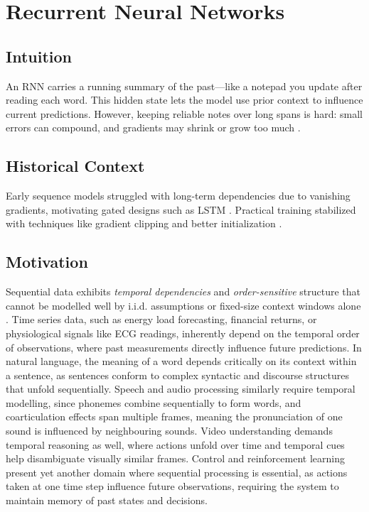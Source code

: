 
\section{Recurrent Neural Networks }
\label{sec:rnns}

\subsection*{Intuition}

An RNN carries a running summary of the past—like a notepad you update after reading each word. This hidden state lets the model use prior context to influence current predictions. However, keeping reliable notes over long spans is hard: small errors can compound, and gradients may shrink or grow too much \cite{GoodfellowEtAl2016}.

\subsection*{Historical Context}

Early sequence models struggled with long-term dependencies due to vanishing gradients, motivating gated designs such as LSTM \cite{Hochreiter1997}. Practical training stabilized with techniques like gradient clipping and better initialization \cite{GoodfellowEtAl2016}.


\subsection{Motivation}

Sequential data exhibits \emph{temporal dependencies} and \emph{order-sensitive} structure that cannot be modelled well by i.i.d. assumptions or fixed-size context windows alone \cite{GoodfellowEtAl2016,Prince2023,Bishop2006}. Time series data, such as energy load forecasting, financial returns, or physiological signals like ECG readings, inherently depend on the temporal order of observations, where past measurements directly influence future predictions. In natural language, the meaning of a word depends critically on its context within a sentence, as sentences conform to complex syntactic and discourse structures that unfold sequentially. Speech and audio processing similarly require temporal modelling, since phonemes combine sequentially to form words, and coarticulation effects span multiple frames, meaning the pronunciation of one sound is influenced by neighbouring sounds. Video understanding demands temporal reasoning as well, where actions unfold over time and temporal cues help disambiguate visually similar frames. Control and reinforcement learning present yet another domain where sequential processing is essential, as actions taken at one time step influence future observations, requiring the system to maintain memory of past states and decisions.

